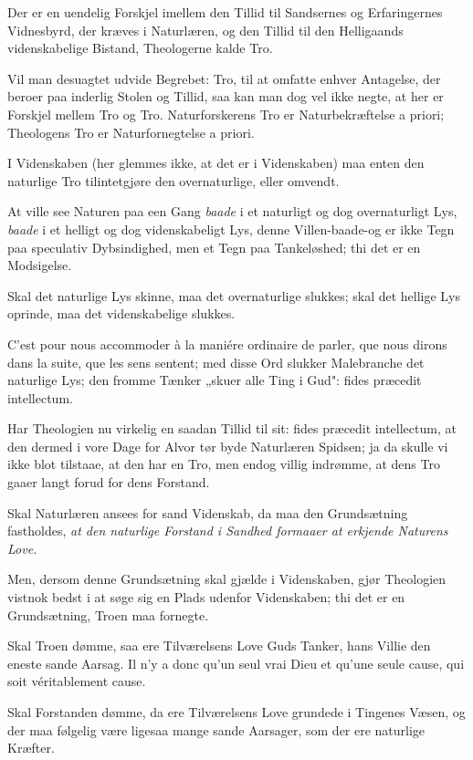 \documentclass[12pt,a4paper]{article}
\newcommand{\opage}[1]{\marginnote{\footnotesize\textit{[#1]}}}
\begin{document}
Der er en uendelig Forskjel imellem den Tillid til Sandsernes og Erfaringernes
Vidnesbyrd, der kræves i Naturlæren, og den Tillid til den Helligaands
videnskabelige Bistand, Theologerne kalde Tro.

Vil man desuagtet udvide Begrebet: Tro, til at omfatte enhver Antagelse, der
beroer paa inderlig Stolen og Tillid, saa kan man dog vel ikke negte, at her er
Forskjel mellem Tro og Tro. Naturforskerens Tro er Naturbekræftelse a priori;
Theologens Tro er Naturfornegtelse a priori.

I Videnskaben (her glemmes ikke, at det er i Videnskaben) maa enten den naturlige
Tro tilintetgjøre den overnaturlige, eller omvendt.

At ville see Naturen paa een Gang \emph{baade} i et naturligt og dog
overnaturligt Lys, \emph{baade} i et helligt og dog videnskabeligt Lys, denne
Villen-baade-og er ikke Tegn paa speculativ Dybsindighed, men et Tegn paa
Tankeløshed; thi det er en Modsigelse.

Skal det naturlige Lys skinne, maa det overnaturlige slukkes; skal det hellige
Lys oprinde, maa det videnskabelige slukkes.

C'est pour nous accommoder à la maniére ordinaire de parler, que nous dirons dans
la suite, que les sens sentent; med disse Ord slukker Malebranche det naturlige
Lys; den fromme Tænker „skuer alle Ting i Gud": fides præcedit intellectum.

Har Theologien nu virkelig en saadan Tillid til sit: fides præcedit intellectum,
at den dermed i vore Dage for Alvor tør byde Naturlæren Spidsen; ja da skulle vi
ikke blot tilstaae, at den har en Tro, men endog villig indrømme, at dens Tro
gaaer langt forud for dens Forstand.

Skal Naturlæren ansees for sand Videnskab, da maa den Grundsætning fastholdes,
\emph{at den naturlige Forstand i Sandhed formaaer at erkjende Naturens Love.}

Men, dersom denne Grundsætning skal gjælde i Videnskaben, gjør
\opage{33} Theologien vistnok bedst i at søge sig en Plads udenfor Videnskaben; thi det er
en Grundsætning, Troen maa fornegte.

Skal Troen dømme, saa ere Tilværelsens Love Guds Tanker, hans Villie den eneste
sande Aarsag. Il n'y a donc qu'un seul vrai Dieu et qu'une seule cause, qui soit
véritablement cause.

Skal Forstanden dømme, da ere Tilværelsens Love grundede i Tingenes Væsen, og der
maa følgelig være ligesaa mange sande Aarsager, som der ere naturlige Kræfter.
\end{document}
